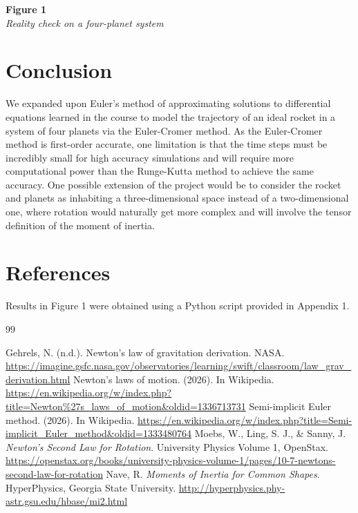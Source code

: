 \documentclass{article}
\begin{document}
\textbf{Figure 1}\\
\textit{Reality check on a four-planet system}
\begin{center}
\end{center}

\section{Conclusion}
We expanded upon Euler's method of approximating solutions to differential equations learned in the course to model the trajectory of an ideal rocket in a system of four planets via the Euler-Cromer method. As the Euler-Cromer method is first-order accurate, one limitation is that the time steps must be incredibly small for high accuracy simulations and will require more computational power than the Runge-Kutta method to achieve the same accuracy. One possible extension of the project would be to consider the rocket and planets as inhabiting a three-dimensional space instead of a two-dimensional one, where rotation would naturally get more complex and will involve the tensor definition of the moment of inertia.

\section{References}
Results in Figure 1 were obtained using a Python script provided in Appendix 1.

\vspace{-1cm}

\begin{thebibliography}{99}

Gehrels, N. (n.d.). Newton’s law of gravitation derivation. NASA. \url{https://imagine.gsfc.nasa.gov/observatories/learning/swift/classroom/law_grav_derivation.html}
Newton’s laws of motion. (2026). In Wikipedia. \url{https://en.wikipedia.org/w/index.php?title=Newton%27s_laws_of_motion&oldid=1336713731}
Semi-implicit Euler method. (2026). In Wikipedia. \url{https://en.wikipedia.org/w/index.php?title=Semi-implicit_Euler_method&oldid=1333480764}
Moebs, W., Ling, S. J., \& Sanny, J. \textit{Newton’s Second Law for Rotation}. University Physics Volume 1, OpenStax. 
\url{https://openstax.org/books/university-physics-volume-1/pages/10-7-newtons-second-law-for-rotation}
Nave, R. \textit{Moments of Inertia for Common Shapes}. HyperPhysics, Georgia State University. 
\url{http://hyperphysics.phy-astr.gsu.edu/hbase/mi2.html}
\end{thebibliography}
\end{document}
